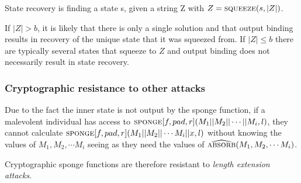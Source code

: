 \begin{defn}
State recovery is finding a state s, given a string Z with $Z = \textsc{squeeze}(s, \vert Z\vert )$.
\end{defn}


If $\vert Z\vert > b$, it is likely that there is only a single solution and that output binding results in recovery of the unique state that it was squeezed from. If $\vert Z \vert \le b$ there are typically several states that squeeze to $Z$ and output binding does not necessarily result in state recovery.

\subsubsection{Cryptographic resistance to other attacks}

\begin{rem}
Due to the fact the inner state is not output by the sponge function, if a malevolent individual has access to $\textsc{sponge}\lbrack f , pad, r\rbrack (M_1 \vert \vert M_2 \vert \vert \cdots \vert \vert M_i, l)$, they cannot calculate $\textsc{sponge}\lbrack f , pad, r\rbrack (M_1\vert \vert M_2 \vert \vert \cdots M_i \vert \vert x, l)$ without knowing the values of  $M_1,M_2,\cdots M_i$ seeing as they need the values of $\widehat{\textsc{absorb}}(M_1,M_2,\cdots M_i)$.

Cryptographic sponge functions are therefore resistant to \emph{length extension attacks}.
\end{rem}
